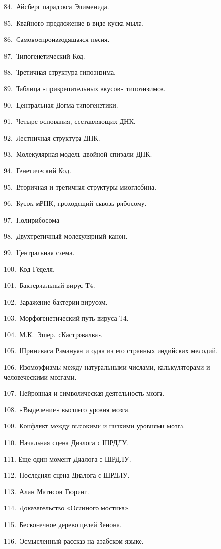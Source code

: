 \documentclass[../main.tex]{subfiles}
\begin{document}
84.~Айсберг парадокса Эпименида.

85.~Квайново предложение в виде куска мыла.

86.~Самовоспроизводящаяся песня.

87.~Типогенетический Код.

88.~Третичная структура типоэнзима.

89.~Таблица «прикрепительных вкусов» типоэнзимов.

90.~Центральная Догма типогенетики.

91.~Четыре основания, составляющих ДНК.

92.~Лестничная структура ДНК.

93.~Молекулярная модель двойной спирали ДНК.

94.~Генетический Код.

95.~Вторичная и третичная структуры миоглобина.

96.~Кусок мРНК, проходящий сквозь рибосому.

97.~Полирибосома.

98.~Двухтретичный молекулярный канон.

99.~Центральная схема.

100.~Код Гёделя.

101.~Бактериальный вирус Т4.

102.~Заражение бактерии вирусом.

103.~Морфогенетический путь вируса Т4.

104.~М.К.~Эшер. «Кастровалва».

105.~Шриниваса Рамануян и одна из его странных индийских мелодий.

106.~Изоморфизмы между натуральными числами, калькуляторами и человеческими мозгами.

107.~Нейронная и символическая деятельность мозга.

108.~«Выделение» высшего уровня мозга.

109.~Конфликт между высокими и низкими уровнями мозга.

110.~Начальная сцена Диалога с ШРДЛУ.

111. Еще один момент Диалога с ШРДЛУ.

112.~Последняя сцена Диалога с ШРДЛУ.

113.~Алан Матисон Тюринг.

114.~Доказательство «Ослиного мостика».

115.~Бесконечное дерево целей Зенона.

116.~Осмысленный рассказ на арабском языке.
\end{document}
